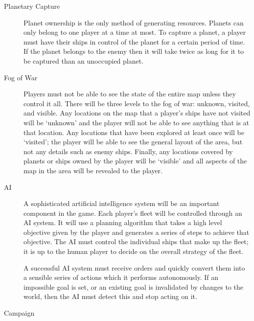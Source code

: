 \begin{description}

	\item[Planetary Capture]

	Planet ownership is the only method of generating resources. Planets can only belong to
	one player at a time at most. To capture a planet, a player must have their ships in control
	of the planet for a certain period of time. If the planet belongs to the enemy then it will
	take twice as long for it to be captured than an unoccupied planet.


	\item[Fog of War]

	Players must not be able to see the state of the entire map unless they control it all. There
	will be three levels to the fog of war: unknown, visited, and visible. Any locations on the map
	that a player's ships have not visited will be `unknown' and the player will not be able to see
	anything that is at that location. Any locations that have been explored at least once will be
	`visited'; the player will be able to see the general layout of the area, but not any details
	such as enemy ships. Finally, any locations covered by planets or ships owned by the player will
	be `visible' and all aspects of the map in the area will be revealed to the player.
	
	\item[AI]

	A sophisticated artificial intelligence system will be an important component in the game.
	Each player's fleet will be controlled through an AI system. It will use a planning algorithm
	that takes a high level objective given by the player and generates a series of steps to
	achieve that objective. The AI must control the individual ships that make up the fleet; it
	is up to the human player to decide on the overall strategy of the fleet.

	A successful AI system must receive orders and quickly convert them into a sensible series of
	actions which it performs autonomously. If an impossible goal is set, or an existing goal is
	invalidated by changes to the world, then the AI must detect this and stop acting on it.


	\item[Campaign]


\end{description}
